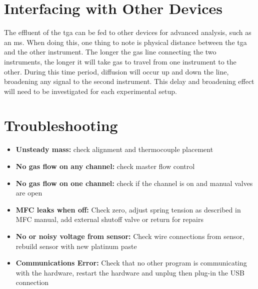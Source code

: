 \section{Interfacing with Other Devices}
    The effluent of the \gls{tga} can be fed to other devices for advanced analysis, such as an \gls{ms}.
    When doing this, one thing to note is physical distance between the \gls{tga} and the other instrument.
    The longer the gas line connecting the two instruments, the longer it will take gas to travel from one instrument to the other.
    During this time period, diffusion will occur up and down the line, broadening any signal to the second instrument.
    This delay and broadening effect will need to be investigated for each experimental setup.

\section{Troubleshooting}
    \begin{itemize}
      \item \textbf{Unsteady mass:} check alignment and thermocouple placement
      \item \textbf{No gas flow on any channel:} check master flow control
      \item \textbf{No gas flow on one channel:} check if the channel is on and manual valves are open
      \item \textbf{MFC leaks when off:} Check zero, adjust spring tension as described in MFC manual, add external shutoff valve or return for repairs
      \item \textbf{No or noisy voltage from  sensor:} Check wire connections from sensor, rebuild sensor with new platinum paste
      \item \textbf{Communications Error:} Check that no other program is communicating with the hardware, restart the hardware and unplug then plug-in the USB connection
    \end{itemize}
